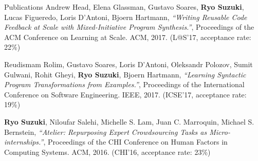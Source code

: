 \documentclass{resume} %
\begin{document}
\begin{rSection}{Publications}
Andrew Head, Elena Glassman, Gustavo Soares, {\bf Ryo Suzuki}, Lucas Figueredo, Loris D'Antoni, Bjoern Hartmann,
{\it ``Writing Reusable Code Feedback at Scale with Mixed-Initiative Program Synthesis.''},
Proceedings of the ACM Conference on Learning at Scale. ACM, 2017.
(L@S'17, acceptance rate: 22\%)

Reudismam Rolim, Gustavo Soares, Loris D'Antoni, Oleksandr Polozov, Sumit Gulwani, Rohit Gheyi, {\bf Ryo Suzuki}, Bjoern Hartmann,
{\it ``Learning Syntactic Program Transformations from Examples.''},
Proceedings of the International Conference on Software Engineering. IEEE, 2017.
(ICSE'17, acceptance rate: 19\%)

{\bf Ryo Suzuki}, Niloufar Salehi, Michelle S. Lam,
Juan C. Marroquin, Michael S. Bernstein,
{\it ``Atelier: Repurposing Expert Crowdsourcing Tasks as Micro-internships.''},
Proceedings of the CHI Conference on Human Factors in Computing Systems. ACM, 2016.
(CHI'16, acceptance rate: 23\%)

\end{rSection}



\end{document}

